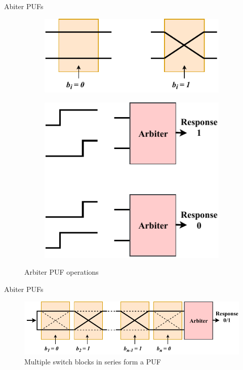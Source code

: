 \documentclass[10pt, compress]{beamer}
\begin{document}
\begin{frame}{Abiter PUFs}
    \begin{figure}[ht]
        \centering
        \begin{subfigure}[b]{0.58\textwidth}
            \includegraphics[width=\textwidth]{figures/switch_block_operations.pdf}
            \label{fig:switch_block_operations}
        \end{subfigure}
        \begin{subfigure}[b]{0.33\textwidth}
            \includegraphics[width=\textwidth]{figures/arbiter_operation.pdf}
            \label{fig:arbiter_operations}
        \end{subfigure}
        \caption{Arbiter PUF operations}\label{fig:puf_operations}
    \end{figure}
\end{frame}


\begin{frame}{Abiter PUFs}
    \begin{figure}
        \centering
        \includegraphics[width=\textwidth]{figures/multiple_switch_blocks.pdf}
        \caption{Multiple switch blocks in series form a PUF}
    \end{figure}
\end{frame}
\end{document}
